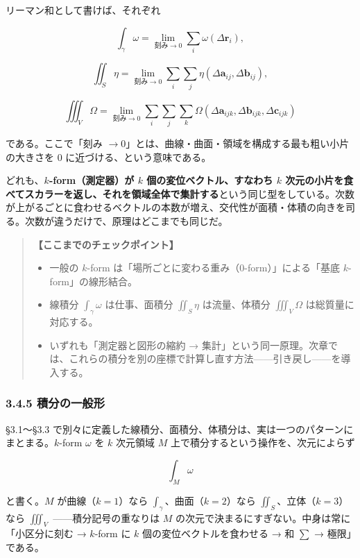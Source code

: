 \documentclass[a4paper,12pt,openany]{book}
\begin{document}
リーマン和として書けば、それぞれ

\[
\int_\gamma \omega
= \lim_{\text{刻み}\to 0}
\sum_i \omega(\Delta\mathbf{r}_i),
\]

\[
\iint_S \eta
= \lim_{\text{刻み}\to 0}
\sum_i\sum_j\eta(\Delta\mathbf{a}_{ij},\Delta\mathbf{b}_{ij}),
\]

\[
\iiint_V \Omega
= \lim_{\text{刻み}\to 0}
\sum_i\sum_j\sum_k
\Omega(\Delta\mathbf{a}_{ijk},\Delta\mathbf{b}_{ijk},\Delta\mathbf{c}_{ijk})
\]

である。ここで「刻み
\(\to 0\)」とは、曲線・曲面・領域を構成する最も粗い小片の大きさを \(0\)
に近づける、という意味である。

どれも、\textbf{$k$-form（測定器）が $k$ 個の変位ベクトル、すなわち $k$ 次元の小片を食べてスカラーを返し、それを領域全体で集計する}という同じ型をしている。次数が上がるごとに食わせるベクトルの本数が増え、交代性が面積・体積の向きを司る。次数が違うだけで、原理はどこまでも同じだ。

\begin{quote}
\textbf{【ここまでのチェックポイント】}

\begin{itemize}
\item
  一般の \(k\)-form は「場所ごとに変わる重み（\(0\)-form）」による「基底
  \(k\)-form」の線形結合。
\item
  線積分 \(\int_\gamma \omega\) は仕事、面積分 \(\iint_S \eta\)
  は流量、体積分 \(\iiint_V \Omega\) は総質量に対応する。
\item
  いずれも「測定器と図形の縮約 →
  集計」という同一原理。次章では、これらの積分を別の座標で計算し直す方法——引き戻し——を導入する。
\end{itemize}
\end{quote}

\hypertarget{ux7a4dux5206ux306eux4e00ux822cux5f62}{%
\subsubsection{3.4.5
積分の一般形}\label{ux7a4dux5206ux306eux4e00ux822cux5f62}}

§3.1〜§3.3
で別々に定義した線積分、面積分、体積分は、実は一つのパターンにまとまる。\(k\)-form
\(\omega\) を \(k\) 次元領域 \(M\)
上で積分するという操作を、次元によらず

\[\int_M \omega\]

と書く。\(M\) が曲線（\(k=1\)）なら \(\int_\gamma\)、曲面（\(k=2\)）なら
\(\iint_S\)、立体（\(k=3\)）なら \(\iiint_V\) ——積分記号の重なりは
\(M\) の次元で決まるにすぎない。中身は常に「小区分に刻む → \(k\)-form に
\(k\) 個の変位ベクトルを食わせる → 和 \(\sum\) → 極限」である。
\end{document}
